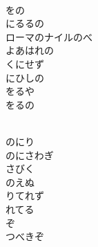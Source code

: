 \documentclass[10pt,b5j]{tarticle} %
\begin{document}
\vspace{1.5em} %
\newcommand{\linespace}{0.5em} %
\newcommand{\blocksize}{0.5\hsize} %
\newcommand{\itemmargin}{3em} %
\begin{enumerate} %
    \setlength{\itemindent}{\itemmargin} %
    \begin{minipage}[c]{\blocksize}
    
        \vspace{\linespace}
        \item~\\
        をの\\
        にるるの\\
        ローマのナイルのべ\\
        よあはれの\\
        くにせず\\
        にひしの\\
        をるや\\
        をるの
        
    \end{minipage}
    \begin{minipage}[c]{\blocksize}
        
        \vspace{\linespace}
        \item~\\
        のにり　\\
        のにさわぎ\\
        さびく　\\
        のえぬ\\
        りてれず\\
        れてる\\
        ぞ\\
        つべきぞ
        

\end{minipage}
\end{enumerate}
\end{document}
